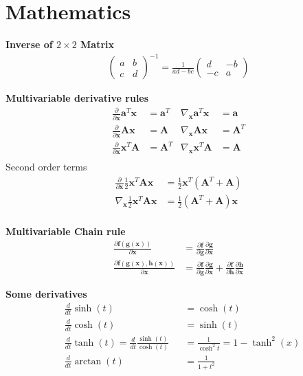 \setcounter{section}{7}
\section{Mathematics}
\textbf{Inverse of \(2\times2\) Matrix}
\begin{align*}
    \begin{pmatrix}
        a & b \\ c & d 
        \end{pmatrix}^{-1} = 
    \frac{1}{ad-bc}
    \begin{pmatrix}
        d & -b \\ -c & a 
    \end{pmatrix}
\end{align*}

\textbf{Multivariable derivative rules}
\begin{align*}
    \frac{\partial}{\partial\bm{x}} \bm{a}^T\bm{x} &=  \bm{a}^T &
    \nabla_{\bm{x}}\bm{a}^T\bm{x} &=  \bm{a} \\
    \frac{\partial}{\partial\bm{x}} \bm{Ax} &=  \bm{A} &
    \nabla_{\bm{x}}\bm{Ax} &= \bm{A}^T  \\
    \frac{\partial}{\partial\bm{x}} \bm{x}^T\bm{A} &=  \bm{A}^T &
    \nabla_{\bm{x}}\bm{x}^T\bm{A} &= \bm{A} \\
\end{align*}
Second order terms
\begin{align*}
    \frac{\partial}{\partial\bm{x}} \frac{1}{2}\bm{x}^T\bm{Ax} &=  \frac{1}{2}\bm{x}^T(\bm{A}^T+\bm{A}) \\
    \nabla_{\bm{x}} \frac{1}{2}\bm{x}^T\bm{Ax} &=  \frac{1}{2}(\bm{A}^T+\bm{A})\bm{x} \\
\end{align*}

\textbf{Multivariable Chain rule}
\begin{align*}
    \frac{\partial\bm{f}(\bm{g}(\bm{x}))}{\partial\bm{x}} &= \frac{\partial\bm{f}}{\partial\bm{g}}
    \frac{\partial\bm{g}}{\partial\bm{x}} \\
    \frac{\partial\bm{f}(\bm{g}(\bm{x}),\bm{h}(\bm{x}))}{\partial\bm{x}} &= \frac{\partial\bm{f}}{\partial\bm{g}}
     \frac{\partial\bm{g}}{\partial\bm{x}} + \frac{\partial\bm{f}}{\partial\bm{h}}\frac{\partial\bm{h}}{\partial\bm{x}}
\end{align*}

\textbf{Some derivatives}
\begin{align*}
    &\frac{d}{dt}\sinh(t) &&= \cosh(t) \\
    &\frac{d}{dt}\cosh(t) &&= \sinh(t) \\
    &\frac{d}{dt}\tanh(t) = \frac{d}{dt}\frac{\sinh(t)}{\cosh(t)} &&= \frac{1}{\cosh^2t} = 1-\tanh^2(x) \\
    &\frac{d}{dt}\arctan(t) &&= \frac{1}{1+t^2}
\end{align*}

